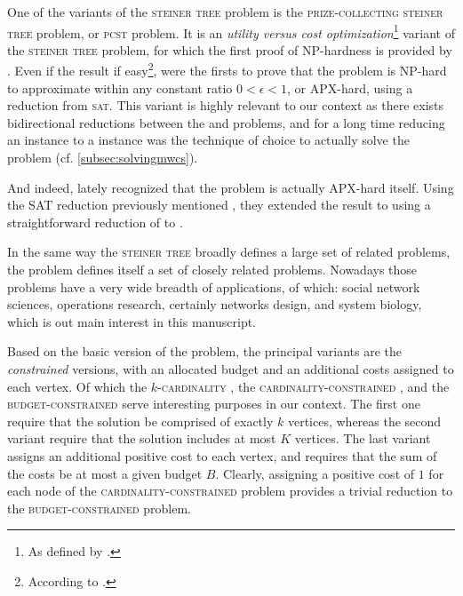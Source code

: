 	One of the variants of the \textsc{steiner tree} problem is the \textsc{prize-collecting steiner tree} problem, or \textsc{pcst} problem.
	It is an \emph{utility versus cost optimization}\footnote{As defined by \textcite{conrad2007connections}.} variant of the \textsc{steiner tree} problem, for which the first proof of NP-hardness is provided by \textcite{camerini1979complexity}.
	Even if the result if easy\footnote{According to \textcite[footnote 12]{feigenbaum2000sharing}.}, \textcite{feigenbaum2000sharing} were the firsts to prove that the \pcst{} problem is NP-hard to approximate within any constant ratio $0 < \epsilon < 1$, or APX-hard, using a reduction from \textsc{sat}.
	This variant is highly relevant to our context as there exists bidirectional reductions between the \pcst{} and \mwcs{} problems, and for a long time reducing an \mwcs{} instance to a \pcst{} instance was the technique of choice to actually solve the problem (cf. \cref{subsec:solvingmwcs}).

	And indeed, lately \textcite{alvarez2013maximum} recognized that the \mwcs{} problem is actually APX-hard itself.
	Using the SAT reduction previously mentioned \parencite{feigenbaum2000sharing}, they extended the result to \mwcs{} using a straightforward reduction of \pcst{} to \mwcs{}.

	In the same way the \textsc{steiner tree} broadly defines a large set of related problems, the \mwcs{} problem defines itself a set of closely related problems.
	Nowadays those problems have a very wide breadth of applications, of which: social network sciences, operations research, certainly networks design, and system biology, which is out main interest in this manuscript.

	Based on the basic version of the \mwcs{} problem, the principal variants are the \emph{constrained} versions, with an allocated budget and an additional costs assigned to each vertex.
	Of which the \textsc{$k$-cardinality \mwcs{}}, the \textsc{cardinality-constrained \mwcs{}}, and the \textsc{budget-constrained \mwcs{}} serve interesting purposes in our context.
	The first one require that the solution be comprised of exactly $k$ vertices, whereas the second variant require that the solution includes at most $K$ vertices.
	The last variant assigns an additional positive cost to each vertex, and requires that the sum of the costs be at most a given budget $B$.
	Clearly, assigning a positive cost of $1$ for each node of the \textsc{cardinality-constrained \mwcs{}} problem provides a trivial reduction to the \textsc{budget-constrained \mwcs{}} problem.

